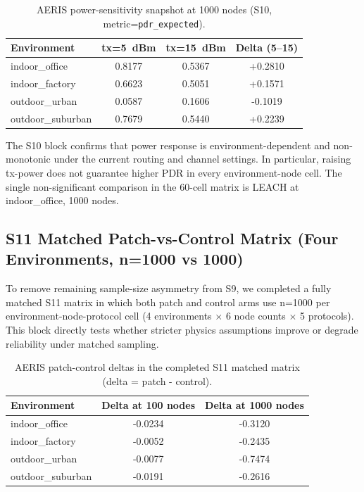 \documentclass[sensors,article,submit,moreauthors,pdftex]{Definitions/mdpi}
\begin{document}
\begin{table}[H]
\caption{AERIS power-sensitivity snapshot at 1000 nodes (S10, metric=\texttt{pdr\_expected}).}
\label{tab:s10_aeris_1000}
\centering
\begin{tabular}{lccc}
\toprule
Environment & tx=\SI{5}{dBm} & tx=\SI{15}{dBm} & Delta (5--15) \\
\midrule
indoor\_office    & 0.8177 & 0.5367 & +0.2810 \\
indoor\_factory   & 0.6623 & 0.5051 & +0.1571 \\
outdoor\_urban    & 0.0587 & 0.1606 & -0.1019 \\
outdoor\_suburban & 0.7679 & 0.5440 & +0.2239 \\
\bottomrule
\end{tabular}
\end{table}

The S10 block confirms that power response is environment-dependent and non-monotonic under the current routing and channel settings. In particular, raising tx-power does not guarantee higher PDR in every environment-node cell. The single non-significant comparison in the 60-cell matrix is LEACH at indoor\_office, 1000 nodes.

\subsection{S11 Matched Patch-vs-Control Matrix (Four Environments, n=1000 vs 1000)}
To remove remaining sample-size asymmetry from S9, we completed a fully matched S11 matrix in which both patch and control arms use n=1000 per environment-node-protocol cell (4 environments $\times$ 6 node counts $\times$ 5 protocols). This block directly tests whether stricter physics assumptions improve or degrade reliability under matched sampling.

\begin{table}[H]
\caption{AERIS patch-control deltas in the completed S11 matched matrix (delta = patch - control).}
\label{tab:s11_aeris_delta}
\centering
\begin{tabular}{lcc}
\toprule
Environment & Delta at 100 nodes & Delta at 1000 nodes \\
\midrule
indoor\_office    & -0.0234 & -0.3120 \\
indoor\_factory   & -0.0052 & -0.2435 \\
outdoor\_urban    & -0.0077 & -0.7474 \\
outdoor\_suburban & -0.0191 & -0.2616 \\
\bottomrule
\end{tabular}
\end{table}
\end{document}
